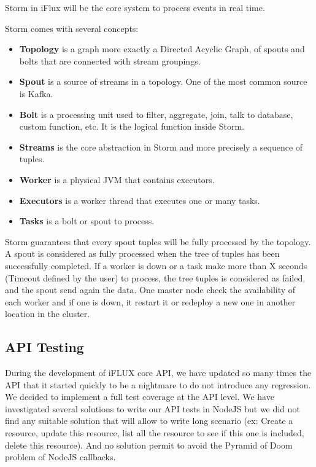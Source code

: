 Storm in iFlux will be the core system to process events in real time.  

Storm comes with several concepts:
\begin{itemize}
\item\textbf{Topology} is a graph more exactly a Directed Acyclic Graph, of spouts and bolts that are connected with stream groupings. 
\item\textbf{Spout} is a source of streams in a topology. One of the most common source is Kafka. 
\item\textbf{Bolt} is a processing unit used to filter, aggregate, join, talk to database, custom function, etc. It is the logical function inside Storm. 
\item\textbf{Streams} is the core abstraction in Storm and more precisely a sequence of tuples. 
\item\textbf{Worker} is a physical JVM that contains executors. 
\item\textbf{Executors} is a worker thread that executes one or many tasks.
\item\textbf{Tasks} is a bolt or spout to process.
\end{itemize}

Storm guarantees that every spout tuples will be fully processed by the topology. A spout is considered as fully processed when the tree of tuples has been successfully completed. If a worker is down or a task make more than X seconds (Timeout defined by the user) to process, the tree tuples is considered as failed, and the spout send again the data. One master node check the availability of each worker and if one is down, it restart it or redeploy a new one in another location in the cluster. 

\subsection{API Testing}

During the development of iFLUX core API, we have updated so many times the API that it started quickly to be a nightmare to do not introduce any regression. We decided to implement a full test coverage at the API level. We have investigated several solutions to write our API tests in NodeJS but we did not find any suitable solution that will allow to write long scenario (ex: Create a resource, update this resource, list all the resource to see if this one is included, delete this resource). And no solution permit to avoid the Pyramid of Doom problem of NodeJS callbacks.

